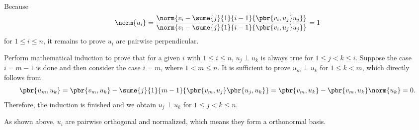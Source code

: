 \documentclass[english, nochinese]{../TeXTemplate/pkupaper}
\begin{document}
\begin{thmquestion}
\
\begin{thmproof}
Because
\begin{equation}
\norm{u_i} = \frac{\norm{ v_i - \sume{j}{1}{ i - 1 }{ \pbr{ v_i, u_j } u_j } }}{\norm{ v_i - \sume{j}{1}{ i - 1 }{ \pbr{ v_i, u_j } u_j } }} = 1
\end{equation}
for $ 1 \le i \le n $, it remains to prove $u_i$ are pairwise perpendicular.

Perform mathematical induction to prove that for a given $i$ with $ 1 \le i \le n $, $ u_j \perp u_k $ is always true for $ 1 \le j < k \le i $. Suppose the case $ i = m - 1  $ is done and then consider the case $ i = m $, where $ 1 < m \le n $. It is sufficient to prove $ u_m \perp u_k $ for $ 1 \le k < m $, which directly follows from
\begin{equation}
\pbr{ u_m, u_k } = \pbr{ v_m, u_k  } - \sume{j}{1}{ m - 1 }{ \pbr{ v_m, u_j } \pbr{ u_j, u_k } } = \pbr{ v_m, u_k } - \pbr{ v_m, u_k } \norm{u_k} = 0.
\end{equation}
Therefore, the induction is finished and we obtain $ u_j \perp u_k $ for $ 1 \le j < k \le n $.

As shown above, $u_i$ are pairwise orthogonal and normalized, which means they form a orthonormal basis.

\sqed
\end{thmproof}
\end{thmquestion}
\end{document}
